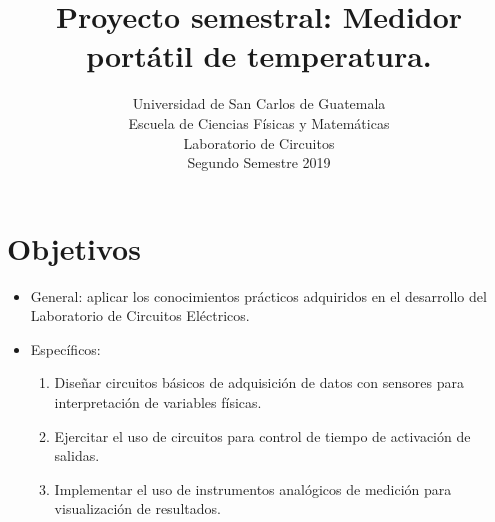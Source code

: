 \documentclass[letterpaper, 12 pt, conference]{ieeeconf}  %
\title{\LARGE \bf
Proyecto semestral: Medidor portátil de temperatura.
}
\author{Universidad de San Carlos de Guatemala \\%
Escuela de Ciencias Físicas y Matemáticas\\
Laboratorio de Circuitos\\
Segundo Semestre 2019
}
\begin{document}
\maketitle
\thispagestyle{empty}
\pagestyle{empty}

\section{Objetivos}
\begin{itemize}
    \item General: aplicar los conocimientos prácticos adquiridos en el desarrollo del Laboratorio de Circuitos Eléctricos.
    \item Específicos:
    \begin{enumerate}
    \item Diseñar circuitos básicos de adquisición de datos con sensores para interpretación de variables físicas.
    \item Ejercitar el uso de circuitos para control de tiempo de activación de salidas.
    \item Implementar el uso de instrumentos analógicos de medición para visualización de resultados.
\end{enumerate}
\end{itemize}
\end{document}
